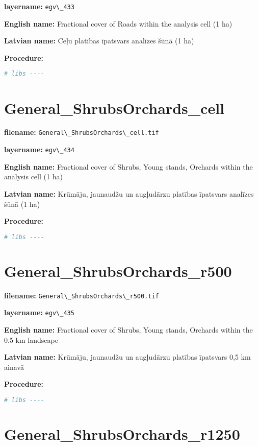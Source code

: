 \documentclass[
]{book}
\newcommand{\passthrough}[1]{#1}
\begin{document}
\textbf{layername:} \passthrough{\lstinline!egv\_433!}

\textbf{English name:} Fractional cover of Roads within the analysis cell (1 ha)

\textbf{Latvian name:} Ceļu platības īpatsvars analīzes šūnā (1 ha)

\textbf{Procedure:}

\begin{lstlisting}[language=R]
# libs ----
\end{lstlisting}

\section{General\_ShrubsOrchards\_cell}\label{ch06.434}

\textbf{filename:} \passthrough{\lstinline!General\_ShrubsOrchards\_cell.tif!}

\textbf{layername:} \passthrough{\lstinline!egv\_434!}

\textbf{English name:} Fractional cover of Shrubs, Young stands, Orchards within the analysis cell (1 ha)

\textbf{Latvian name:} Krūmāju, jaunaudžu un augļudārzu platības īpatsvars analīzes šūnā (1 ha)

\textbf{Procedure:}

\begin{lstlisting}[language=R]
# libs ----
\end{lstlisting}

\section{General\_ShrubsOrchards\_r500}\label{ch06.435}

\textbf{filename:} \passthrough{\lstinline!General\_ShrubsOrchards\_r500.tif!}

\textbf{layername:} \passthrough{\lstinline!egv\_435!}

\textbf{English name:} Fractional cover of Shrubs, Young stands, Orchards within the 0.5 km landscape

\textbf{Latvian name:} Krūmāju, jaunaudžu un augļudārzu platības īpatsvars 0,5 km ainavā

\textbf{Procedure:}

\begin{lstlisting}[language=R]
# libs ----
\end{lstlisting}

\section{General\_ShrubsOrchards\_r1250}\label{ch06.436}
\end{document}

